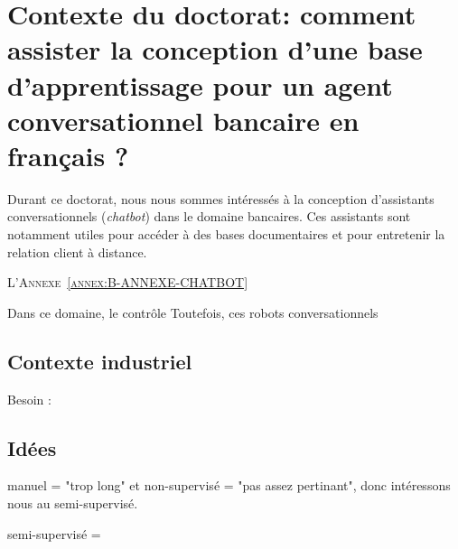\section{Contexte du doctorat: comment assister la conception d'une base d'apprentissage pour un agent conversationnel bancaire en français ?}
\label{section:2.4-CONTEXTE-DOCTORAT}


	Durant ce doctorat, nous nous sommes intéressés à la conception d'assistants conversationnels (\textit{chatbot}) dans le domaine bancaires.
	Ces assistants sont notamment utiles pour accéder à des bases documentaires et pour entretenir la relation client à distance.
	\begin{leftBarInformation}
		L'\textsc{Annexe~\ref{annex:B-ANNEXE-CHATBOT}}
	\end{leftBarInformation}
	
	Dans ce domaine, le contrôle Toutefois, ces robots conversationnels 
	
	
	\subsection{Contexte industriel}
		Besoin : 
	
	\subsection{Idées}
		manuel = "trop long" et non-supervisé = "pas assez pertinant", donc intéressons nous au semi-supervisé.
		
		semi-supervisé = 


